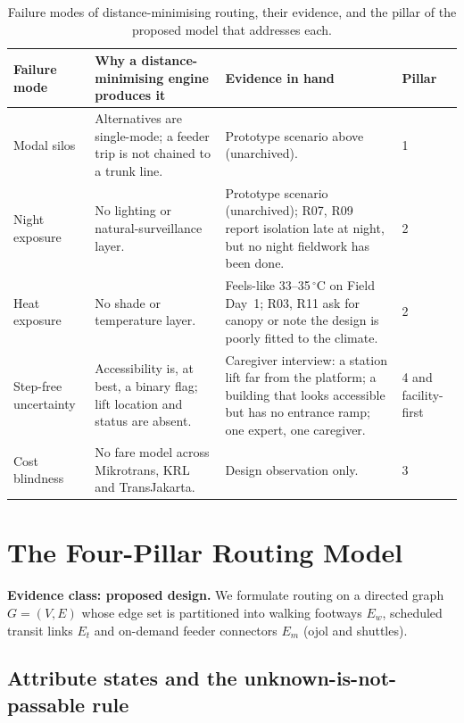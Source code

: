 \documentclass[11pt,a4paper]{article}
\newcommand{\evclass}[2]{\noindent\textcolor{#1}{\small\textbf{Evidence class: #2.}}\enspace}
\begin{document}
\begin{table}[H]
\centering
\small
\caption{Failure modes of distance-minimising routing, their evidence, and the pillar of the
proposed model that addresses each.}
\label{tab:failure-modes}
\renewcommand{\arraystretch}{1.15}
\begin{tabularx}{\textwidth}{@{}P{2.7cm} Y Y P{1.5cm}@{}}
\toprule
\textbf{Failure mode} & \textbf{Why a distance-minimising engine produces it} & \textbf{Evidence in hand} & \textbf{Pillar} \\
\midrule
Modal silos & Alternatives are single-mode; a feeder trip is not chained to a trunk line. & Prototype scenario above (unarchived). & 1 \\
Night exposure & No lighting or natural-surveillance layer. & Prototype scenario (unarchived); R07, R09 report isolation late at night, but no night fieldwork has been done. & 2 \\
Heat exposure & No shade or temperature layer. & Feels-like 33--35\,$^\circ$C on Field Day~1; R03, R11 ask for canopy or note the design is poorly fitted to the climate. & 2 \\
Step-free uncertainty & Accessibility is, at best, a binary flag; lift location and status are absent. & Caregiver interview: a station lift far from the platform; a building that looks accessible but has no entrance ramp; one expert, one caregiver. & 4 and facility-first \\
Cost blindness & No fare model across Mikrotrans, KRL and TransJakarta. & Design observation only. & 3 \\
\bottomrule
\end{tabularx}
\end{table}

\section{The Four-Pillar Routing Model}\label{sec:model}

\evclass{pijakblue}{proposed design}
We formulate routing on a directed graph $G=(V,E)$ whose edge set is partitioned into walking
footways $E_w$, scheduled transit links $E_t$ and on-demand feeder connectors $E_m$ (ojol and
shuttles).

\subsection{Attribute states and the unknown-is-not-passable rule}
\end{document}
